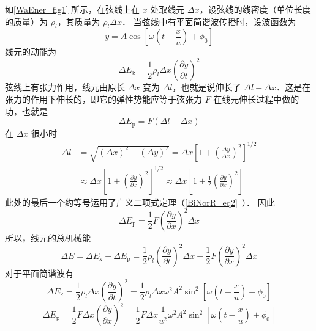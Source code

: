 如\autoref{WaEner_fig1} 所示，在弦线上在 $x$ 处取线元 $\Delta x$，设弦线的线密度（单位长度的质量）为 $\rho_l$，其质量为 $\rho_l\Delta x$．
当弦线中有平面简谐波传播时，设波函数为
\begin{equation}
y=A \cos \left[\omega\left(t-\frac{x}{u}\right)+\phi_{0}\right]
\end{equation}
线元的动能为
\begin{equation}
\Delta E_{\mathrm{k}}=\frac{1}{2} \rho_{l} \Delta x\left(\frac{\partial y}{\partial t}\right)^{2}
\end{equation}
弦线上有张力作用，线元由原长 $\Delta x$ 变为 $\Delta l$，也就是说伸长了 $\Delta l-\Delta x$．这是在张力的作用下伸长的，即它的弹性势能应等于弦张力 $F$ 在线元伸长过程中做的功，也就是
\begin{equation}
\Delta E_{\mathrm{p}}=F(\Delta l-\Delta x)
\end{equation}
在 $\Delta x$ 很小时
\begin{equation}
\begin{aligned} \Delta l &=\sqrt{(\Delta x)^{2}+(\Delta y)^{2}}=\Delta x\left[1+\left(\frac{\Delta y}{\Delta x}\right)^{2}\right]^{1 / 2} \\ & \approx \Delta x\left[1+\left(\frac{\partial y}{\partial x}\right)^{2}\right]^{1 / 2} \approx \Delta x\left[1+\frac{1}{2}\left(\frac{\partial y}{\partial x}\right)^{2}\right] \end{aligned}
\end{equation}
此处的最后一个约等号运用了广义二项式定理（\autoref{BiNorR_eq2}~）．
因此
\begin{equation}
\Delta E_{\mathrm{p}}=\frac{1}{2} F\left(\frac{\partial y}{\partial x}\right)^{2} \Delta x
\end{equation}
所以，线元的总机械能
\begin{equation}
\Delta E=\Delta E_{\mathrm{k}}+\Delta E_{\mathrm{p}}=\frac{1}{2} \rho_{l}\left(\frac{\partial y}{\partial t}\right)^{2} \Delta x+\frac{1}{2} F\left(\frac{\partial y}{\partial x}\right)^{2} \Delta x
\end{equation}
对于平面简谐波有
\begin{equation}
\Delta E_{\mathrm{k}}=\frac{1}{2} \rho_{l} \Delta x\left(\frac{\partial y}{\partial t}\right)^{2}=\frac{1}{2} \rho_{l} \Delta x \omega^{2} A^{2} \sin ^{2}\left[\omega\left(t-\frac{x}{u}\right)+\phi_{0}\right]
\end{equation}
\begin{equation}
\Delta E_{\mathrm{p}}=\frac{1}{2} F \Delta x\left(\frac{\partial y}{\partial x}\right)^{2}=\frac{1}{2} F \Delta x \frac{1}{u^{2}} \omega^{2} A^{2} \sin ^{2}\left[\omega\left(t-\frac{x}{u}\right)+\phi_{0}\right]
\end{equation}
